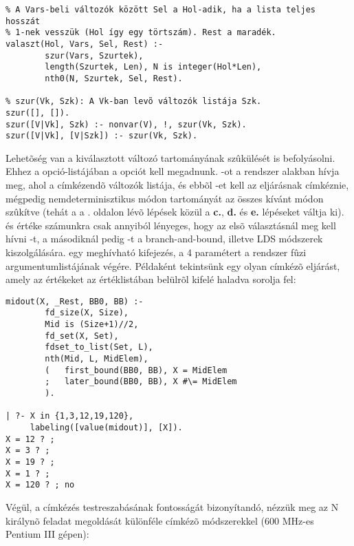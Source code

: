 \begin{verbatim}
% A Vars-beli változók között Sel a Hol-adik, ha a lista teljes hosszát
% 1-nek vesszük (Hol így egy törtszám). Rest a maradék.
valaszt(Hol, Vars, Sel, Rest) :-
        szur(Vars, Szurtek), 
        length(Szurtek, Len), N is integer(Hol*Len),
        nth0(N, Szurtek, Sel, Rest).

% szur(Vk, Szk): A Vk-ban levõ változók listája Szk.
szur([], []).
szur([V|Vk], Szk) :- nonvar(V), !, szur(Vk, Szk).
szur([V|Vk], [V|Szk]) :- szur(Vk, Szk).
\end{verbatim}

\label{value:enum}
Lehetõség van a kiválasztott változó tartományának szûkülését is befolyásolni. Ehhez a
 opció-listájában a  opciót kell megadnunk. -ot
a rendszer  alakban hívja meg, ahol \cd{[X|Rest]} a címkézendõ
változók listája, és ebbõl -et kell az eljárásnak címkéznie, mégpedig
nemdeterminisztikus módon  tartományát az összes kívánt módon szûkítve (tehát
a  a \pageref{labeling:lepesek}. oldalon lévõ lépések közül a
{\bf c.}, {\bf d.} és {\bf e.} lépéseket váltja ki).  és  értéke számunkra
csak annyiból lényeges, hogy az elsõ választásnál meg kell hívni -t,
a másodiknál pedig -t a branch-and-bound, illetve LDS módszerek
kiszolgálására.  egy meghívható kifejezés, a 4 paramétert a rendszer fûzi 
argumentumlistájának végére. Példaként tekintsünk egy olyan címkézõ eljárást, amely
az értékeket az értéklistában belülrõl kifelé haladva sorolja fel:

\begin{verbatim}
midout(X, _Rest, BB0, BB) :-
        fd_size(X, Size),
        Mid is (Size+1)//2,
        fd_set(X, Set), 
        fdset_to_list(Set, L),
        nth(Mid, L, MidElem),
        (   first_bound(BB0, BB), X = MidElem
        ;   later_bound(BB0, BB), X #\= MidElem
        ).

| ?- X in {1,3,12,19,120}, 
     labeling([value(midout)], [X]).
X = 12 ? ;
X = 3 ? ;
X = 19 ? ;
X = 1 ? ;
X = 120 ? ; no
\end{verbatim}

Végül, a címkézés testreszabásának fontosságát bizonyítandó, nézzük meg az N királynõ
feladat megoldását különféle címkézõ módszerekkel (600 MHz-es Pentium III gépen):

